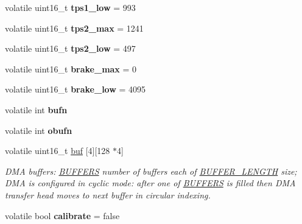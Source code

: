 \begin{DoxyCompactItemize}
\item 
\hypertarget{group___board__model__group_ga51d40eb16833e50f71e595ab0a45795e}{volatile uint16\-\_\-t {\bfseries tps1\-\_\-low} = 993}\label{group___board__model__group_ga51d40eb16833e50f71e595ab0a45795e}

\item 
\hypertarget{group___board__model__group_ga53381436ea8db96c356db8b305bec988}{volatile uint16\-\_\-t {\bfseries tps2\-\_\-max} = 1241}\label{group___board__model__group_ga53381436ea8db96c356db8b305bec988}

\item 
\hypertarget{group___board__model__group_gab03e92ec2b5f742e5a147a6589d3975e}{volatile uint16\-\_\-t {\bfseries tps2\-\_\-low} = 497}\label{group___board__model__group_gab03e92ec2b5f742e5a147a6589d3975e}

\item 
\hypertarget{group___board__model__group_ga744857a9bc060647cfc4ad47017c5bee}{volatile uint16\-\_\-t {\bfseries brake\-\_\-max} = 0}\label{group___board__model__group_ga744857a9bc060647cfc4ad47017c5bee}

\item 
\hypertarget{group___board__model__group_gaaf843a7e652e5cf9b270d0b211be937c}{volatile uint16\-\_\-t {\bfseries brake\-\_\-low} = 4095}\label{group___board__model__group_gaaf843a7e652e5cf9b270d0b211be937c}

\item 
\hypertarget{group___board__model__group_gad2658b77f345b15c03759c02d1ba0e81}{volatile int {\bfseries bufn}}\label{group___board__model__group_gad2658b77f345b15c03759c02d1ba0e81}

\item 
\hypertarget{group___board__model__group_gafef4d6ed48b3edc5f7a74defba82e7d8}{volatile int {\bfseries obufn}}\label{group___board__model__group_gafef4d6ed48b3edc5f7a74defba82e7d8}

\item 
\hypertarget{group___board__model__group_gabaadbcc3b48e8ec3798741a74a672046}{volatile uint16\-\_\-t \hyperlink{group___board__model__group_gabaadbcc3b48e8ec3798741a74a672046}{buf} \mbox{[}4\mbox{]}\mbox{[}128 $\ast$4\mbox{]}}\label{group___board__model__group_gabaadbcc3b48e8ec3798741a74a672046}

\begin{DoxyCompactList}\small\item\em D\-M\-A buffers\-: \hyperlink{group___board__model__group_gaabe0f927d44a09f458bd5fe5ab4e2f7f}{B\-U\-F\-F\-E\-R\-S} number of buffers each of \hyperlink{group___board__model__group_gaf7b7dc9a200cb1404c280bd500fd1551}{B\-U\-F\-F\-E\-R\-\_\-\-L\-E\-N\-G\-T\-H} size; D\-M\-A is configured in cyclic mode\-: after one of \hyperlink{group___board__model__group_gaabe0f927d44a09f458bd5fe5ab4e2f7f}{B\-U\-F\-F\-E\-R\-S} is filled then D\-M\-A transfer head moves to next buffer in circular indexing. \end{DoxyCompactList}\item 
\hypertarget{group___board__model__group_ga481292a7bd814aefcdc2deb9872f5421}{volatile bool {\bfseries calibrate} = false}\label{group___board__model__group_ga481292a7bd814aefcdc2deb9872f5421}


\end{DoxyCompactItemize}
